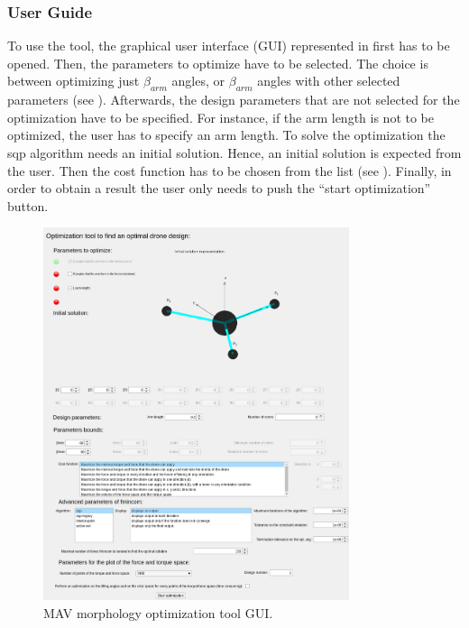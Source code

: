 \subsubsection{User Guide}
\label{sec:user_guide}
To use the tool, the graphical user interface (GUI) represented in 
first has to be opened. Then, the parameters to optimize have to be selected. The
choice is between optimizing just $\beta_{arm}$ angles, or $\beta_{arm}$ angles with other
selected parameters (see ). Afterwards, the design parameters that
are not selected for the optimization have to be specified. For instance, if the arm
length is not to be optimized, the user has to specify an arm length. To solve the
optimization the sqp algorithm needs an initial solution. Hence, an initial solution
is expected from the user. Then the cost function has to be chosen from the list
(see ). Finally, in order to obtain a result the user only needs to
push the “start optimization” button.

\begin{figure}[!h]
  \centering
  \includegraphics[width=0.8\textwidth]{images/gui.png}
  \caption{MAV morphology optimization tool GUI.}
  \label{fig:gui}
\end{figure}

